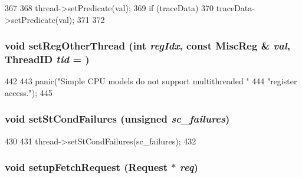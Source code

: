\begin{DoxyCode}
367     {
368         thread->setPredicate(val);
369         if (traceData) {
370             traceData->setPredicate(val);
371         }
372     }
\end{DoxyCode}
\hypertarget{classBaseSimpleCPU_a6674d3dd977dcee573918b5d2d45b8ef}{
\subsubsection[{setRegOtherThread}]{\setlength{\rightskip}{0pt plus 5cm}void setRegOtherThread (int {\em regIdx}, \/  const {\bf MiscReg} \& {\em val}, \/  {\bf ThreadID} {\em tid} = {})}}
\label{classBaseSimpleCPU_a6674d3dd977dcee573918b5d2d45b8ef}



\begin{DoxyCode}
442      {
443         panic("Simple CPU models do not support multithreaded "
444               "register access.\n");
445      }
\end{DoxyCode}
\hypertarget{classBaseSimpleCPU_abbe779fa43c72cd485ddb736ab17ff61}{
\subsubsection[{setStCondFailures}]{\setlength{\rightskip}{0pt plus 5cm}void setStCondFailures (unsigned {\em sc\_\-failures})}}
\label{classBaseSimpleCPU_abbe779fa43c72cd485ddb736ab17ff61}



\begin{DoxyCode}
430                                                  {
431         thread->setStCondFailures(sc_failures);
432     }
\end{DoxyCode}
\hypertarget{classBaseSimpleCPU_a06bcbb6a9e9cbcf60796a0843cdf9a35}{
\subsubsection[{setupFetchRequest}]{\setlength{\rightskip}{0pt plus 5cm}void setupFetchRequest ({\bf Request} $\ast$ {\em req})}}
\label{classBaseSimpleCPU_a06bcbb6a9e9cbcf60796a0843cdf9a35}



